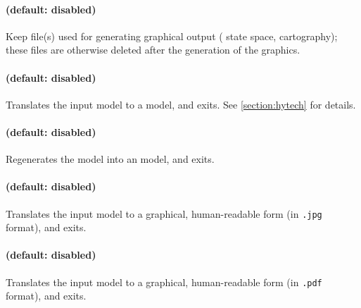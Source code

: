 \paragraph{ (default: disabled)}
Keep file(s) used for generating graphical output (\eg{} state space, cartography); these files are otherwise deleted after the generation of the graphics.



\paragraph{ (default: disabled)}
Translates the input model to a \hytech{} model, and exits.
See \cref{section:hytech} for details.

\paragraph{ (default: disabled)}
Regenerates the model into an \imitator{} model, and exits.

\paragraph{ (default: disabled)}
Translates the input model to a graphical, human-readable form (in \texttt{.jpg} format), and exits.

\paragraph{ (default: disabled)}
Translates the input model to a graphical, human-readable form (in \texttt{.pdf} format), and exits.


